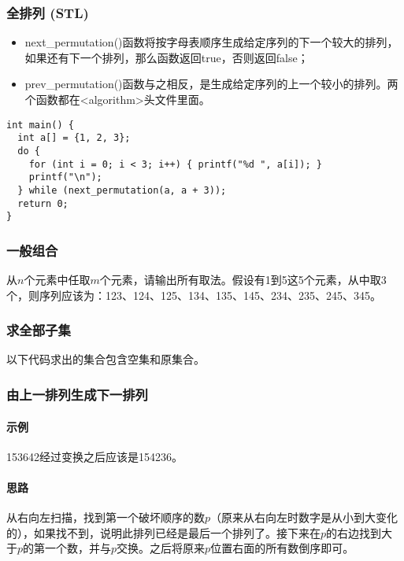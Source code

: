 \subsubsection{全排列 (STL)}

\begin{itemize}
  \item next\_permutation()函数将按字母表顺序生成给定序列的下一个较大的排列，如果还有下一个排列，那么函数返回true，否则返回false；
  \item prev\_permutation()函数与之相反，是生成给定序列的上一个较小的排列。两个函数都在<algorithm>头文件里面。
\end{itemize}

\begin{lstlisting}
int main() {
  int a[] = {1, 2, 3};
  do {
    for (int i = 0; i < 3; i++) { printf("%d ", a[i]); }
    printf("\n");
  } while (next_permutation(a, a + 3));
  return 0;
}
\end{lstlisting}

\subsubsection{一般组合}

从$n$个元素中任取$m$个元素，请输出所有取法。假设有1到5这5个元素，从中取3个，则序列应该为：123、124、125、134、135、145、234、235、245、345。



\subsubsection{求全部子集}

以下代码求出的集合包含空集和原集合。



\subsubsection{由上一排列生成下一排列}

\paragraph{示例} 153642经过变换之后应该是154236。

\paragraph{思路} 从右向左扫描，找到第一个破坏顺序的数$p$（原来从右向左时数字是从小到大变化的），如果找不到，说明此排列已经是最后一个排列了。接下来在$p$的右边找到大于$p$的第一个数，并与$p$交换。之后将原来$p$位置右面的所有数倒序即可。

